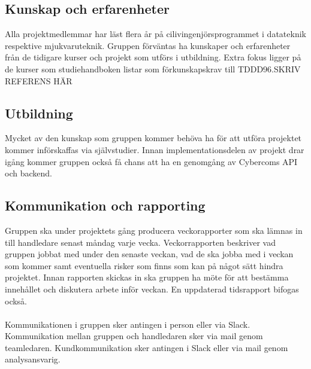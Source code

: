 \subsection{Kunskap och erfarenheter}
Alla projektmedlemmar har läst flera år på cilivingenjörsprogrammet i datateknik respektive mjukvaruteknik. Gruppen förväntas ha kunskaper och erfarenheter från de tidigare kurser och projekt som utförs i utbildning. Extra fokus ligger på de kurser som studiehandboken listar som förkunskapskrav till TDDD96.SKRIV REFERENS HÄR


\subsection{Utbildning}
Mycket av den kunskap som gruppen kommer behöva ha för att utföra projektet kommer införskaffas via självstudier. Innan implementationsdelen av projekt drar igång kommer gruppen också få chans att ha en genomgång av Cybercoms API och backend.

\subsection{Kommunikation och rapporting}
Gruppen ska under projektets gång producera veckorapporter som ska lämnas in till handledare senast måndag varje vecka. Veckorrapporten beskriver vad gruppen jobbat med under den senaste veckan, vad de ska jobba med i veckan som kommer samt eventuella risker som finns som kan på något sätt hindra projektet. Innan rapporten skickas in ska gruppen ha möte för att bestämma innehållet och diskutera arbete inför veckan. En uppdaterad tidsrapport bifogas också.\\
\\
Kommunikationen i gruppen sker antingen i person eller via Slack. Kommunikation mellan gruppen och handledaren sker via mail genom teamledaren. Kundkommunikation sker antingen i Slack eller via mail genom analysansvarig.